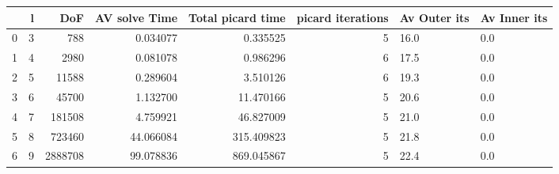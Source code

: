\begin{tabular}{lrrrrrll}
\toprule
{} &  l &      DoF &  AV solve Time &  Total picard time &  picard iterations & Av Outer its & Av Inner its \\
\midrule
0 &  3 &      788 &       0.034077 &           0.335525 &                  5 &         16.0 &          0.0 \\
1 &  4 &     2980 &       0.081078 &           0.986296 &                  6 &         17.5 &          0.0 \\
2 &  5 &    11588 &       0.289604 &           3.510126 &                  6 &         19.3 &          0.0 \\
3 &  6 &    45700 &       1.132700 &          11.470166 &                  5 &         20.6 &          0.0 \\
4 &  7 &   181508 &       4.759921 &          46.827009 &                  5 &         21.0 &          0.0 \\
5 &  8 &   723460 &      44.066084 &         315.409823 &                  5 &         21.8 &          0.0 \\
6 &  9 &  2888708 &      99.078836 &         869.045867 &                  5 &         22.4 &          0.0 \\
\bottomrule
\end{tabular}
